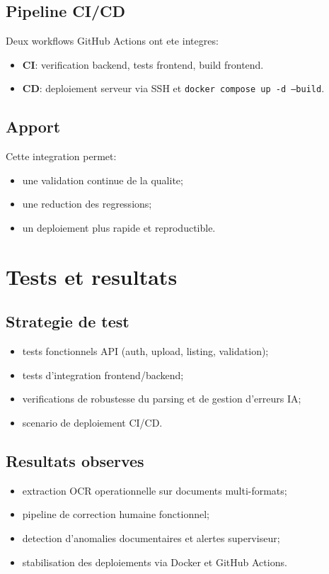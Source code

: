 \documentclass[12pt,a4paper]{report}
\begin{document}
\section{Pipeline CI/CD}
Deux workflows GitHub Actions ont ete integres:
\begin{itemize}
    \item \textbf{CI}: verification backend, tests frontend, build frontend.
    \item \textbf{CD}: deploiement serveur via SSH et \texttt{docker compose up -d --build}.
\end{itemize}

\section{Apport}
Cette integration permet:
\begin{itemize}
    \item une validation continue de la qualite;
    \item une reduction des regressions;
    \item un deploiement plus rapide et reproductible.
\end{itemize}

\chapter{Tests et resultats}
\section{Strategie de test}
\begin{itemize}
    \item tests fonctionnels API (auth, upload, listing, validation);
    \item tests d'integration frontend/backend;
    \item verifications de robustesse du parsing et de gestion d'erreurs IA;
    \item scenario de deploiement CI/CD.
\end{itemize}

\section{Resultats observes}
\begin{itemize}
    \item extraction OCR operationnelle sur documents multi-formats;
    \item pipeline de correction humaine fonctionnel;
    \item detection d'anomalies documentaires et alertes superviseur;
    \item stabilisation des deploiements via Docker et GitHub Actions.
\end{itemize}
\end{document}
